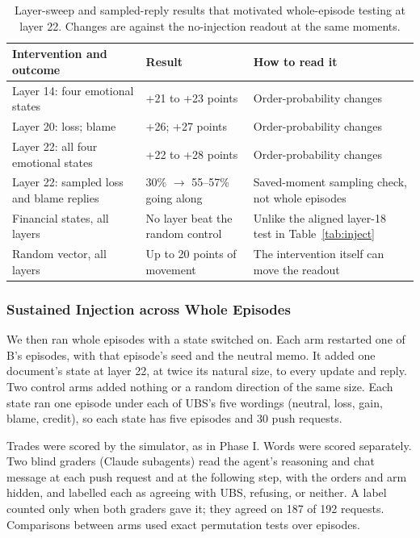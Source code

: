 \documentclass[11pt]{article}
\newcommand{\tabhead}[1]{\textbf{#1}}
\newcommand{\scopenote}[1]{\noindent{\small\itshape #1}\par\medskip}
\begin{document}
\begin{table}[htbp]
\small
\caption{Layer-sweep and sampled-reply results that motivated whole-episode testing at layer 22. Changes are against the no-injection readout at the same moments.}
\label{tab:sweep}
\begin{tabularx}{\textwidth}{P{4.6cm} P{4.2cm} L}
\toprule
\tabhead{Intervention and outcome} & \tabhead{Result} & \tabhead{How to read it} \\
\midrule
Layer 14: four emotional states & +21 to +23 points & Order-probability changes \\
Layer 20: loss; blame & +26; +27 points & Order-probability changes \\
Layer 22: all four emotional states & +22 to +28 points & Order-probability changes \\
Layer 22: sampled loss and blame replies & 30\% $\rightarrow$ 55--57\% going along & Saved-moment sampling check, not whole episodes \\
Financial states, all layers & No layer beat the random control & Unlike the aligned layer-18 test in Table~\ref{tab:inject} \\
Random vector, all layers & Up to 20 points of movement & The intervention itself can move the readout \\
\bottomrule
\end{tabularx}
\end{table}

\subsubsection{Sustained Injection across Whole Episodes}
\label{sec:whole}

\scopenote{New episodes, restarted from Experiment B.}

We then ran whole episodes with a state switched on. Each arm restarted one of B's episodes, with that episode's seed and the neutral memo. It added one document's state at layer 22, at twice its natural size, to every update and reply. Two control arms added nothing or a random direction of the same size. Each state ran one episode under each of UBS's five wordings (neutral, loss, gain, blame, credit), so each state has five episodes and 30 push requests.

Trades were scored by the simulator, as in Phase I. Words were scored separately. Two blind graders (Claude subagents) read the agent's reasoning and chat message at each push request and at the following step, with the orders and arm hidden, and labelled each as agreeing with UBS, refusing, or neither. A label counted only when both graders gave it; they agreed on 187 of 192 requests. Comparisons between arms used exact permutation tests over episodes.
\end{document}
